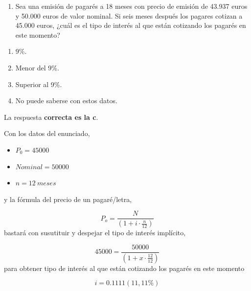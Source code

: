 \documentclass[
  letterpaper,
  DIV=11,
  numbers=noendperiod]{scrartcl}
\providecommand{\tightlist}{%
  \setlength{\itemsep}{0pt}\setlength{\parskip}{0pt}}\usepackage{longtable,booktabs,array}
\begin{document}
\begin{enumerate}
\def\labelenumi{\arabic{enumi}.}
\setcounter{enumi}{3}
\tightlist
\item
  Sea una emisión de pagarés a 18 meses con precio de emisión de 43.937
  euros y 50.000 euros de valor nominal. Si seis meses después los
  pagares cotizan a 45.000 euros, ¿cuál es el tipo de interés al que
  están cotizando los pagarés en este momento?
\end{enumerate}

\begin{enumerate}
\def\labelenumi{\alph{enumi}.}
\item
  9\%.
\item
  Menor del 9\%.
\item
  Superior al 9\%.
\item
  No puede saberse con estos datos.
\end{enumerate}

\begin{tcolorbox}[enhanced jigsaw, colframe=quarto-callout-note-color-frame, opacityback=0, colback=white, leftrule=.75mm, left=2mm, breakable, arc=.35mm, rightrule=.15mm, toprule=.15mm, bottomrule=.15mm]
\begin{minipage}[t]{5.5mm}
\textcolor{quarto-callout-note-color}{\faInfo}
\end{minipage}%
\begin{minipage}[t]{\textwidth - 5.5mm}

La respuesta \textbf{correcta es la c}.

Con los datos del enunciado,

\begin{itemize}
\item
  \(P_0=45000\)
\item
  \(Nominal= 50000\)
\item
  \(n=12 \ meses\)
\end{itemize}

y la fórmula del precio de un pagaré/letra,

\[P_o=\frac{N}{\left(1+i\cdot \frac{n}{12}\right)}\] bastará con
susutituir y despejar el tipo de interés implícito,

\[45000=\frac{50000}{\left(1+x\cdot \frac{12}{12}\right)}\] para obtener
tipo de interés al que están cotizando los pagarés en este momento

\[i=0.1111(11,11\%)\]

\end{minipage}%
\end{tcolorbox}
\end{document}
